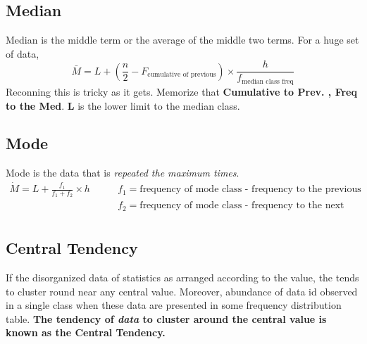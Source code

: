 \documentclass[10pt,a4paper,landscape]{article}
\begin{document}
\subsection{Median}
Median is the middle term or the average of the middle two terms. For a huge set of data,
\begin{equation}
\bar{M} =
L +
\left( \frac{n}{2}  -  F_{\text{cumulative of previous}} \right) \times \frac{h}{f_{\text{median class freq}}}
\end{equation}
Reconning this is tricky as it gets. Memorize that \textbf{Cumulative to Prev. , Freq to the Med}. \textbf{L} is the lower limit to the median class.

\subsection{Mode}
Mode is the data that is \emph{repeated the maximum times}.
\begin{align*}
\dot{M} = L + \frac{f_1}{f_1 + f_2} \times h \qquad				 	
		& f_1 = \text{frequency of mode class - frequency to the previous} \\
	    & f_2 = \text{frequency of mode class - frequency to the next} \\ 
\end{align*}

\subsection{Central Tendency}
If  the disorganized data of statistics as arranged according to the value, the tends to cluster round near any central value. Moreover, abundance of data id observed in a single class when these data are presented in some frequency distribution table. \textbf{The tendency of \emph{data} to cluster around the central value is known as the Central Tendency.}
\end{document}
